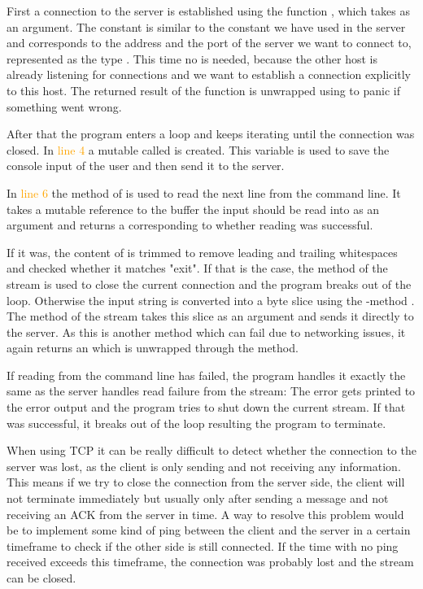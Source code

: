 First a connection to the server is established using the function , which takes
 as an argument. The constant  is similar to the constant we have used in the server and
corresponds to the address and the port of the server we want to connect to, represented as the type . This
time no  is needed, because the other host is already listening for connections and we want to
establish a connection explicitly to this host. The returned result of the function is unwrapped using  to
panic if something went wrong.

After that the program enters a loop and keeps iterating until the connection was closed. In \textcolor{orange}{line 4}
a mutable  called  is created. This variable is used to save the console input of the user and
then send it to the server.

In \textcolor{orange}{line 6} the method  of  is used to read the next
line from the command line. It takes a mutable reference to the buffer the input should be read into as an argument and
returns a  corresponding to whether reading was successful.

If it was, the content of  is trimmed to remove leading and trailing whitespaces and checked whether it
matches "exit". If that is the case, the  method of the stream is used to close the current connection
and the program breaks out of the loop. Otherwise the input string is converted into a byte slice using
the -method . The method  of the stream takes this slice as an argument and
sends it directly to the server. As this is another method which can fail due to networking issues, it again returns an
 which is unwrapped through the  method.

If reading from the command line has failed, the program handles it exactly the same as the server handles read failure
from the stream: The error gets printed to the error output and the program tries to shut down the current stream. If
that was successful, it breaks out of the loop resulting the program to terminate.

When using TCP it can be really difficult to detect whether the connection to the server was lost, as the client is
only sending and not receiving any information. This means if we try to close the connection from the server side, the
client will not terminate immediately but usually only after sending a message and not receiving an ACK from the server
in time. A way to resolve this problem would be to implement some kind of ping between the client and the server in a
certain timeframe to check if the other side is still connected. If the time with no ping received exceeds this
timeframe, the connection was probably lost and the stream can be closed.

